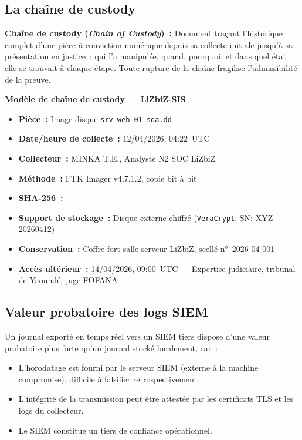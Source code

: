 \subsection{La chaîne de custody}

\begin{boxdef}
\textbf{Chaîne de custody (\textit{Chain of Custody})~:} Document traçant
l'historique complet d'une pièce à conviction numérique depuis sa collecte
initiale jusqu'à sa présentation en justice~: qui l'a manipulée, quand,
pourquoi, et dans quel état elle se trouvait à chaque étape.
Toute rupture de la chaîne fragilise l'admissibilité de la preuve.
\end{boxdef}

\begin{boxcustody}
\textbf{Modèle de chaîne de custody --- LiZbiZ-SIS}

\begin{itemize}
  \item \textbf{Pièce~:} Image disque \texttt{srv-web-01-sda.dd}
  \item \textbf{Date/heure de collecte~:} 12/04/2026, 04:22~UTC
  \item \textbf{Collecteur~:} MINKA T.E., Analyste N2 SOC LiZbiZ
  \item \textbf{Méthode~:} FTK Imager v4.7.1.2, copie bit à bit
  \item \textbf{SHA-256~:} 
  \item \textbf{Support de stockage~:} Disque externe chiffré
        (\texttt{VeraCrypt}, SN: XYZ-20260412)
  \item \textbf{Conservation~:} Coffre-fort salle serveur LiZbiZ,
        scellé n°~2026-04-001
  \item \textbf{Accès ultérieur~:} 14/04/2026, 09:00~UTC ---
        Expertise judiciaire, tribunal de Yaoundé, juge FOFANA
\end{itemize}
\end{boxcustody}

\subsection{Valeur probatoire des logs SIEM}

Un journal exporté en temps réel vers un SIEM tiers dispose d'une valeur
probatoire plus forte qu'un journal stocké localement, car~:
\begin{itemize}
  \item L'horodatage est fourni par le serveur SIEM (externe à la machine
        compromise), difficile à falsifier rétrospectivement.
  \item L'intégrité de la transmission peut être attestée par les
        certificats TLS et les logs du collecteur.
  \item Le SIEM constitue un tiers de confiance opérationnel.
\end{itemize}

